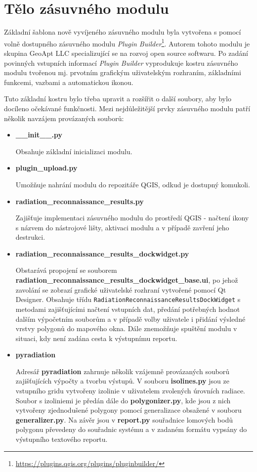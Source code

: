 \section{Tělo zásuvného modulu}

Základní šablona nově vyvíjeného zásuvného modulu byla vytvořena s pomocí volně dostupného zásuvného modulu \textit{Plugin Builder}\footnote{\url{https://plugins.qgis.org/plugins/pluginbuilder/}}. Autorem tohoto modulu je skupina GeoApt LLC specializující se na rozvoj open source softwaru. Po zadání povinných vstupních informací \textit{Plugin Builder} vyprodukuje kostru zásuvného modulu tvořenou mj. prvotním grafickým uživatelským rozhraním, základními funkcemi, vazbami a automatickou ikonou.

Tuto základní kostru bylo třeba upravit a rozšířit o další soubory, aby bylo docíleno očekávané funkčnosti. Mezi nejdůležitější prvky zásuvného modulu patří několik navzájem provázaných souborů:

\begin{itemize}
	\item \textbf{\_\_init\_\_.py} 
	
	Obsahuje základní inicializaci modulu.
		
	\item \textbf{plugin\_upload.py} 

	Umožňuje nahrání modulu do repozitáře QGIS, odkud je dostupný komukoli. 

	\item \textbf{radiation\_reconnaissance\_results.py} 
	
	Zajišťuje implementaci zásuvného modulu do prostředí QGIS - načtení ikony s názvem do nástrojové lišty, aktivaci modulu a v případě zavření jeho destrukci.

	\item \textbf{radiation\_reconnaissance\_results\_dockwidget.py}
	
	Obstarává propojení se souborem \textbf{radiation\_reconnaissance\_results\_dockwidget\_base.ui}, po jehož zavolání se zobrazí grafické uživatelské rozhraní vytvořené pomocí Qt Designer. Obsahuje třídu \texttt{RadiationReconnaissanceResultsDockWidget} s metodami zajišťujícími načtení vstupních dat, předání potřebných hodnot dalším výpočetním souborům a v případě volby uživatele i přidání výsledné vrstvy polygonů do mapového okna. Dále znemožňuje spuštění modulu v situaci, kdy není zadána cesta k výstupnímu reportu.

	\item \textbf{pyradiation}
		
		Adresář \textbf{pyradiation} zahrnuje několik vzájemně provázaných souborů zajišťujících výpočty a tvorbu výstupů. V souboru \textbf{isolines.py} jsou ze vstupního gridu vytvořeny izolinie v uživatelem zvolených úrovních radiace. Soubor s izoliniemi je předán dále do \textbf{polygonizer.py}, kde jsou z nich vytvořeny zjednodušené polygony pomocí generalizace obsažené v souboru \textbf{generalizer.py}. Na závěr jsou v \textbf{report.py} souřadnice lomových bodů polygonu převedeny do souřadnic systému  a v zadaném formátu vypsány do výstupního textového reportu.
	
\end{itemize}

